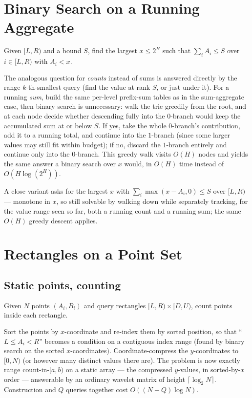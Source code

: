 \documentclass[11pt]{article}
\begin{document}
\section{Binary Search on a Running Aggregate}

\begin{definitionbox}
Given $[L, R)$ and a bound $S$, find the largest $x \le 2^H$ such that
$\sum_i A_i \le S$ over $i \in [L, R)$ with $A_i < x$.
\end{definitionbox}

The analogous question for \emph{counts} instead of sums is answered
directly by the range $k$-th-smallest query (find the value at rank $S$,
or just under it). For a running \emph{sum}, build the same per-level
prefix-sum tables as in the sum-aggregate case, then binary search is
unnecessary: walk the trie greedily from the root, and at each node decide
whether descending fully into the $0$-branch would keep the accumulated
sum at or below $S$. If yes, take the whole $0$-branch's contribution,
add it to a running total, and continue into the $1$-branch (since some
larger values may still fit within budget); if no, discard the $1$-branch
entirely and continue only into the $0$-branch. This greedy walk visits
$O(H)$ nodes and yields the same answer a binary search over $x$ would,
in $O(H)$ time instead of $O(H \log(2^H))$.

A close variant asks for the largest $x$ with
$\sum_{i} \max(x - A_i, 0) \le S$ over $[L, R)$ --- monotone in $x$, so
still solvable by walking down while separately tracking, for the value
range seen so far, both a running count and a running sum; the same
$O(H)$ greedy descent applies.

\section{Rectangles on a Point Set}

\subsection{Static points, counting}
\begin{definitionbox}
Given $N$ points $(A_i, B_i)$ and query rectangles $[L, R) \times [D, U)$,
count points inside each rectangle.
\end{definitionbox}

Sort the points by $x$-coordinate and re-index them by sorted position, so
that ``$L \le A_i < R$'' becomes a condition on a contiguous index range
(found by binary search on the sorted $x$-coordinates). Coordinate-compress
the $y$-coordinates to $[0, N)$ (or however many distinct values there
are). The problem is now exactly range count-in-$[a,b)$ on a static array
--- the compressed $y$-values, in sorted-by-$x$ order --- answerable by an
ordinary wavelet matrix of height $\lceil \log_2 N \rceil$. Construction
and $Q$ queries together cost $O((N + Q)\log N)$.
\end{document}
